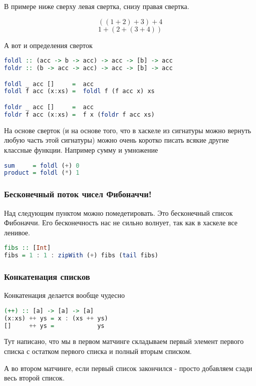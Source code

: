\documentclass[10pt, a4paper]{article}
\begin{document}
В примере ниже сверху левая свертка, снизу правая свертка.

$$((1+2) + 3) + 4$$
$$1 + (2 + (3 + 4))$$

А вот и определения сверток
\begin{lstlisting}[language=haskell]
foldl :: (acc -> b -> acc) -> acc -> [b] -> acc
foldr :: (b -> acc -> acc) -> acc -> [b] -> acc

foldl _ acc []     =  acc 
foldl f acc (x:xs) =  foldl f (f acc x) xs

foldr _ acc []     =  acc 
foldr f acc (x:xs) =  f x (foldr f acc xs)

\end{lstlisting}

На основе сверток (и на основе того, что в хаскеле из сигнатуры можно вернуть любую часть этой сигнатуры) можно очень коротко писать всякие другие классные функции. Например сумму и умножение

\begin{lstlisting}[language=haskell]
sum     = foldl (+) 0
product = foldl (*) 1 
\end{lstlisting}


\subsubsection{Бесконечный поток чисел Фибоначчи!}
Над следующим пунктом можно помедетировать. Это бесконечный список Фибоначчи. Его бесконечность нас не сильно волнует, так как в хаскеле все ленивое.
\begin{lstlisting}[language=haskell]
fibs :: [Int]
fibs = 1 : 1 : zipWith (+) fibs (tail fibs)
\end{lstlisting}


\subsubsection{Конкатенация списков}
Конкатенация делается вообще чудесно

\begin{lstlisting}[language=haskell]
(++) :: [a] -> [a] -> [a]
(x:xs) ++ ys = x : (xs ++ ys)
[]     ++ ys =            ys
\end{lstlisting}

Тут написано, что мы в первом матчинге складываем первый элемент первого списка с остатком первого списка и полный вторым списком.

А во втором матчинге, если первый список закончился - просто добавляем сзади весь второй список.
\end{document}
